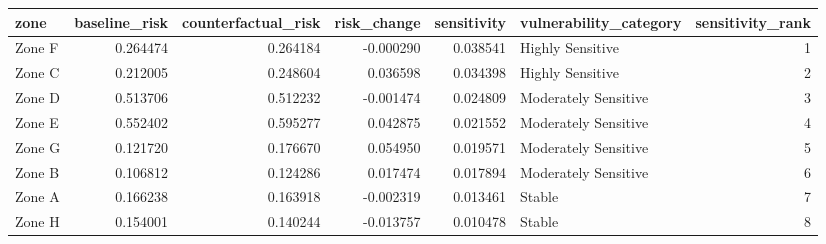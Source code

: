 \begin{tabular}{lrrrrlr}
\toprule
zone & baseline_risk & counterfactual_risk & risk_change & sensitivity & vulnerability_category & sensitivity_rank \\
\midrule
Zone F & 0.264474 & 0.264184 & -0.000290 & 0.038541 & Highly Sensitive & 1 \\
Zone C & 0.212005 & 0.248604 & 0.036598 & 0.034398 & Highly Sensitive & 2 \\
Zone D & 0.513706 & 0.512232 & -0.001474 & 0.024809 & Moderately Sensitive & 3 \\
Zone E & 0.552402 & 0.595277 & 0.042875 & 0.021552 & Moderately Sensitive & 4 \\
Zone G & 0.121720 & 0.176670 & 0.054950 & 0.019571 & Moderately Sensitive & 5 \\
Zone B & 0.106812 & 0.124286 & 0.017474 & 0.017894 & Moderately Sensitive & 6 \\
Zone A & 0.166238 & 0.163918 & -0.002319 & 0.013461 & Stable & 7 \\
Zone H & 0.154001 & 0.140244 & -0.013757 & 0.010478 & Stable & 8 \\
\bottomrule
\end{tabular}
